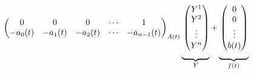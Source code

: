 \documentclass[../notes.tex]{subfiles}
\begin{document}
\begin{itemize}
\begin{itemize}
\begin{align*}
{\begin{pmatrix}
                    0 & 0 & 0 & \cdots & 1\\
                    -a_0(t) & -a_1(t) & -a_2(t) & \cdots & -a_{n-1}(t)\\
                \end{pmatrix}
            }_{A(t)}\underbrace{
                \vphantom{
                    \begin{pmatrix}
                        0 & 1 & 0 & \cdots & 0\\
                        0 & 0 & 1 & \cdots & 0\\
                        \vdots & \vdots & \vdots & \ddots & \vdots\\
                        0 & 0 & 0 & \cdots & 1\\
                        -a_0(t) & -a_1(t) & -a_2(t) & \cdots & -a_{n-1}(t)\\
                    \end{pmatrix}
                }
                \begin{pmatrix}
                    Y^1\\
                    Y^2\\
                    \vdots\\
                    Y^n\\
                \end{pmatrix}
            }_Y+\underbrace{
                \vphantom{
                    \begin{pmatrix}
                        0 & 1 & 0 & \cdots & 0\\
                        0 & 0 & 1 & \cdots & 0\\
                        \vdots & \vdots & \vdots & \ddots & \vdots\\
                        0 & 0 & 0 & \cdots & 1\\
                        -a_0(t) & -a_1(t) & -a_2(t) & \cdots & -a_{n-1}(t)\\
                    \end{pmatrix}
                }
                \begin{pmatrix}
                    0\\
                    0\\
                    \vdots\\
                    b(t)\\
                \end{pmatrix}
            }_{f(t)}
        \end{align*}

\end{itemize}
\end{itemize}
\end{document}
